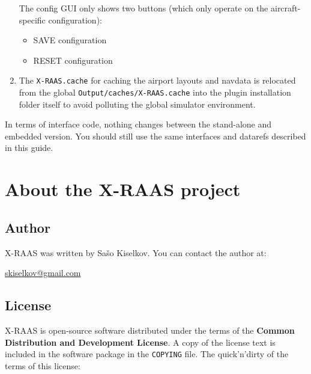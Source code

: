 \documentclass[a4paper,12pt]{article}
\begin{document}
\begin{enumerate}
The config GUI only shows two buttons (which only operate on the
aircraft-specific configuration):

\begin{itemize}

\item SAVE configuration

\item RESET configuration

\end{itemize}

\item The \texttt{X-RAAS.cache} for caching the airport layouts and
navdata is relocated from the global \texttt{Output/caches/X-RAAS.cache}
into the plugin installation folder itself to avoid polluting the
global simulator environment.

\end{enumerate}

\noindent In terms of interface code, nothing changes between the
stand-alone and embedded version. You should still use the same
interfaces and datarefs described in this guide.

\newpage
\section{About the X-RAAS project}

\subsection{Author}

X-RAAS was written by Sašo Kiselkov. You can contact the author at:

\vspace{1em}

\href{mailto:skiselkov@gmail.com}{skiselkov@gmail.com}

\subsection{License}

X-RAAS is open-source software distributed under the terms of the
\textbf{Common Distribution and Development License}. A copy of the
license text is included in the software package in the \texttt{COPYING}
file. The quick'n'dirty of the terms of this license:
\end{document}
